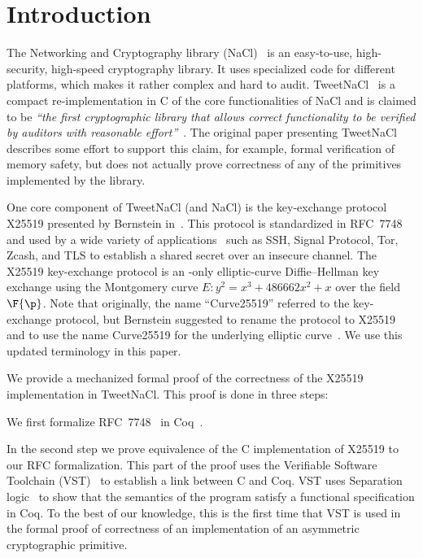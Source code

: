\section{Introduction}
\label{sec:intro}

The Networking and Cryptography library (NaCl)~\cite{BLS12}
is an easy-to-use, high-security, high-speed cryptography library.
It uses specialized code for different platforms, which makes it rather complex and hard to audit.
TweetNaCl~\cite{BGJ+15} is a compact re-implementation in C
of the core functionalities of NaCl and is claimed to be
\emph{``the first cryptographic library that allows correct functionality
to be verified by auditors with reasonable effort''}~\cite{BGJ+15}.
The original paper presenting TweetNaCl describes some effort to support
this claim, for example, formal verification of memory safety, but does not actually
prove correctness of any of the primitives implemented by the library.

One core component of TweetNaCl (and NaCl) is the key-exchange protocol X25519 presented
by Bernstein in~\cite{rfc7748}.
This protocol is standardized in RFC~7748 and used by a wide variety of applications~\cite{things-that-use-curve25519}
such as SSH, Signal Protocol, Tor, Zcash, and TLS to establish a shared secret over
an insecure channel.
The X25519 key-exchange protocol is an \xcoord-only
elliptic-curve Diffie--Hellman key exchange using the Montgomery
curve $E: y^2 = x^3 + 486662 x^2 + x$ over the field $\F{\p}$.
Note that originally, the name ``Curve25519'' referred to the key-exchange protocol,
but Bernstein suggested to rename the protocol to X25519 and to use the name
Curve25519 for the underlying elliptic curve~\cite{Ber14}.
We use this updated terminology in this paper.

We provide a mechanized formal proof of the correctness of the X25519
implementation in TweetNaCl.
This proof is done in three steps:

We first formalize RFC~7748~\cite{rfc7748} in Coq~\cite{coq-faq}.

In the second step we prove equivalence of the C implementation of X25519
to our RFC formalization.
This part of the proof uses the Verifiable Software Toolchain (VST)~\cite{2012-Appel}
to establish a link between C and Coq.
VST uses Separation logic~\cite{1969-Hoare,Reynolds02separationlogic}
to show that the semantics of the program satisfy a functional specification in Coq.
To the best of our knowledge, this is the first time that
VST is used in the formal proof of correctness of an implementation
of an asymmetric cryptographic primitive.

